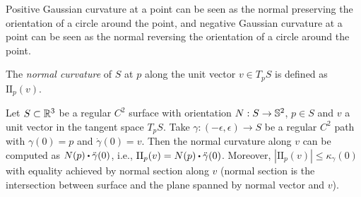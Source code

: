 Positive Gaussian curvature at a point can be seen as the normal preserving the orientation of a circle around the point, and negative Gaussian curvature at a point can be seen as the normal reversing the orientation of a circle around the point.

\begin{definition}
    The \textit{normal curvature} of $S$ at $p$ along the unit vector $v \in T_p S$ is defined as $\text{II}_p(v)$.
\end{definition}

\begin{proposition}
    Let $S\subset \R^3$ be a regular $C^2$ surface with orientation $N : S \to \S^2$, $p \in S$ and $v$ a unit vector in the tangent space $T_pS$. Take $\gamma : (-\epsilon, \epsilon) \to S$ be a regular $C^2$ path with $\gamma(0) = p$ and $\dot{\gamma}(0) = v$. Then the normal curvature along $v$ can be computed as $N(p) \bigcdot \ddot{\gamma}(0)$, i.e., $\text{II}_p(v) = N(p) \bigcdot \ddot{\gamma}(0)$. Moreover, $|\text{II}_p(v)| \leq \kappa_{\gamma}(0)$ with equality achieved by normal section along $v$ (normal section is the intersection between surface and the plane spanned by normal vector and $v$).
\end{proposition}